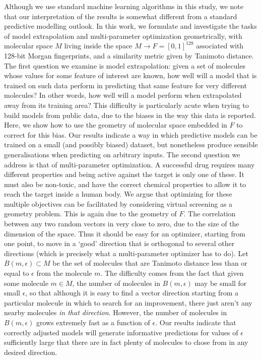\documentclass[journal=jacsat,manuscript=article]{achemso}
\begin{document}
Although we use standard machine learning algorithms in this study, we note that our interpretation of the results is somewhat different from a standard predictive modelling outlook. 
In this work, we formulate and investigate the tasks of model extrapolation and multi-parameter optimization geometrically, with molecular space $M$ living inside the space $M \to F = [0, 1]^{128}$ associated with 128-bit Morgan fingerprints, and a similarity metric given by Tanimoto distance. 
\newline
\newline
The first question we examine is model extrapolation: given a set of molecules whose values for some feature of interest are known, how well will a model that is trained on such data perform in predicting that same feature for very different molecules? In other words, how well will a model perform when extrapolated away from its training area? This difficulty is particularly acute when trying to build models from public data, due to the biases in the way this data is reported\cite{Kalliokoski2013,Tiikkainen2013}. Here, we show how to use the geometry of molecular space embedded in $F$ to correct for this bias. Our results indicate a way in which predictive models can be trained on a small (and possibly biased) dataset, but nonetheless produce sensible generalisations when predicting on arbitrary inputs.
\newline
\newline
The second question we address is that of multi-parameter optimization.  A successful drug requires many different properties and being active against the target is only one of these.  It must also be non-toxic, and have the correct chemical properties to allow it to reach the target inside a human body.  We argue that optimizing for these multiple objectives can be facilitated by considering virtual screening as a geometry problem.
This is again due to the geometry of $F$. The correlation between any two random vectors in very close to zero, due to the size of the dimension of the space.  Thus it should be easy for an optimizer, starting from one point, to move in a `good' direction that is orthogonal to several other directions (which is precisely what a multi-parameter optimizer has to do).  Let $B(m, \epsilon) \subset M$ be the set of molecules that are Tanimoto distance less than or equal to $\epsilon$ from the molecule $m$.  The difficulty comes from the fact that given some molecule $m \in M$, the number of molecules in  $B(m, \epsilon)$ may be small for small $\epsilon$, so that although it is easy to find a vector direction starting from a particular molecule in which to search for an improvement, there just aren't any nearby molecules \textit{in that direction}. However, the number of molecules in $B(m, \epsilon)$ grows extremely fast as a function of $\epsilon$.  Our results indicate that correctly adjusted models will generate informative predictions for values of $\epsilon$ sufficiently large that there are in fact plenty of molecules to chose from in any desired direction.
\end{document}
